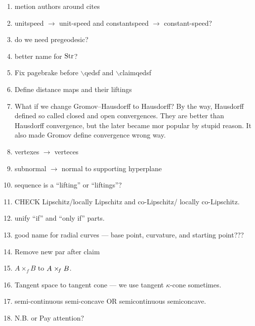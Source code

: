 \begin{enumerate}
\item metion authors around  cites 

\item unitspeed $\to$ unit-speed and constantspeed $\to$ constant-speed?

\item do we need pregeodesic?

\item better name for $\mathop{\rm Str}\nolimits$?

\item Fix pagebrake before $\backslash$qedsf and $\backslash$claimqedsf

\item Define distance maps and their liftings

\item What if we change Gromov--Hausdorff to Hausdorff?
By the way, Hausdorff defined so called closed and open convergences.
They are better than Hausdorff convergence, but the later became mor popular by stupid reason.
It also made Gromov define convergence wrong way.

\item vertexes $\to$ verteces

\item subnormal $\to$ normal to supporting hyperplane

\item sequence is a ``lifting'' or ``liftings''?

\item CHECK Lipschitz/locally Lipschitz and co-Lipschitz/ locally co-Lipschitz.

\item unify ``if'' and ``only if'' parts.

\item good name for radial curves --- base point, curvature, and starting point???

\item Remove new par after claim

\item $A\times_f B$ to $A\warp{f} B$.

\item Tangent space to tangent cone --- we use tangent $\kappa$-cone sometimes.

\item semi-continuous semi-concave OR semicontinuous semiconcave.

\item N.B. or Pay attention?


\end{enumerate}
